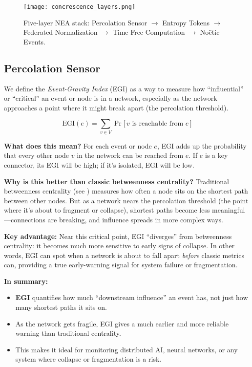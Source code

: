 \documentclass[11pt]{article}
\begin{document}
\begin{figure}[!htb]
  \centering
  \texttt{[image: concrescence\_layers.png]}
  \caption{Five-layer NEA stack: Percolation Sensor $\to$ Entropy Tokens
           $\to$ Federated Normalization $\to$ Time-Free Computation
           $\to$ No\"etic Events.}
  \label{fig:stack}
\end{figure}

\subsection{Percolation Sensor}
\label{sec:percolation-sensor}

We define the \emph{Event-Gravity Index} (EGI) as a way to measure how “influential” or “critical” an event or node is in a network, especially as the network approaches a point where it might break apart (the percolation threshold).

\[
  \mathrm{EGI}(e) = \sum_{v \in V} \Pr\bigl[\,v \text{ is reachable from } e\,\bigr]
\]

\textbf{What does this mean?}  
For each event or node $e$, EGI adds up the probability that every other node $v$ in the network can be reached from $e$. If $e$ is a key connector, its EGI will be high; if it’s isolated, EGI will be low.

\textbf{Why is this better than classic betweenness centrality?}  
Traditional betweenness centrality (see \cite{freeman1977,albert2002}) measures how often a node sits on the shortest path between other nodes. But as a network nears the percolation threshold (the point where it’s about to fragment or collapse), shortest paths become less meaningful—connections are breaking, and influence spreads in more complex ways.

\textbf{Key advantage:}  
Near this critical point, EGI “diverges” from betweenness centrality: it becomes much more sensitive to early signs of collapse. In other words, EGI can spot when a network is about to fall apart \emph{before} classic metrics can, providing a true early-warning signal for system failure or fragmentation.

\textbf{In summary:}  
\begin{itemize}
  \item \textbf{EGI} quantifies how much “downstream influence” an event has, not just how many shortest paths it sits on.
  \item As the network gets fragile, EGI gives a much earlier and more reliable warning than traditional centrality.
  \item This makes it ideal for monitoring distributed AI, neural networks, or any system where collapse or fragmentation is a risk.
\end{itemize}
\end{document}
